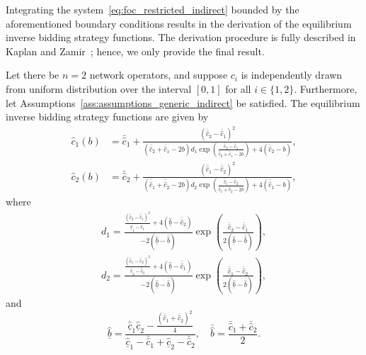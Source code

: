 Integrating the system~\eqref{eq:foc_restricted_indirect} bounded by the aforementioned boundary conditions results in the derivation of the equilibrium inverse bidding strategy functions. The derivation procedure is fully described in Kaplan and Zamir~\cite{KaplanZamir2007}; hence, we only provide the final result.
\begin{proposition}
\label{prop:equilibrium_restricted_indirect}
Let there be $n=2$ network operators, and suppose $c_i$ is independently drawn from uniform distribution over the interval $[0,1]$ for all $i\in \{1, 2\}$. Furthermore, let Assumptions~\ref{ass:assumptions_generic_indirect} be satisfied. The equilibrium inverse bidding strategy functions are given by
\begin{align}
  \label{eq:inverse_equi_bidding_str_1_indirect}
  \hat{c}_1(b) &= \bar{\hat{c}}_1 + \frac{(\bar{\hat{c}}_2 - \bar{\hat{c}}_1)^2}{(\bar{\hat{c}}_2 + \bar{\hat{c}}_1 - 2b)d_1 \exp{\left(\displaystyle\frac{\bar{\hat{c}}_2 - \bar{\hat{c}}_1}{\bar{\hat{c}}_2 + \bar{\hat{c}}_1 - 2b}\right)} + 4(\bar{\hat{c}}_2 - b)},\\[2ex]
  \label{eq:inverse_equi_bidding_str_2_indirect}
  \hat{c}_2(b) &= \bar{\hat{c}}_2 + \frac{(\bar{\hat{c}}_1 - \bar{\hat{c}}_2)^2}{(\bar{\hat{c}}_1 + \bar{\hat{c}}_2 - 2b)d_2 \exp{\left(\displaystyle\frac{\bar{\hat{c}}_1 - \bar{\hat{c}}_2}{\bar{\hat{c}}_1 + \bar{\hat{c}}_2 - 2b}\right)} + 4(\bar{\hat{c}}_1 - b)},
\end{align}
where
\begin{align}
  \label{eq:constant_d_1_indirect}
  d_1 = \frac{\displaystyle\frac{(\bar{\hat{c}}_2 - \bar{\hat{c}}_1)^2}{\underline{\hat{c}}_1 - \bar{\hat{c}}_1} + 4(\underline{\hat{b}} - \bar{\hat{c}}_2)}{-2(\underline{\hat{b}} - \bar{\hat{b}})} \exp{\left(\displaystyle\frac{\bar{\hat{c}}_2 - \bar{\hat{c}}_1}{2(\underline{\hat{b}} - \bar{\hat{b}})}\right)}, \\[2ex]
  \label{eq:constant_d_2_indirect}
  d_2 = \frac{\displaystyle\frac{(\bar{\hat{c}}_1 - \bar{\hat{c}}_2)^2}{\underline{\hat{c}}_2 - \bar{\hat{c}}_2} + 4(\underline{\hat{b}} - \bar{\hat{c}}_1)}{-2(\underline{\hat{b}} - \bar{\hat{b}})} \exp{\left(\frac{\bar{\hat{c}}_1 - \bar{\hat{c}}_2}{2(\underline{\hat{b}} - \bar{\hat{b}})}\right)},
\end{align}
and
\begin{equation}
  \label{eq:bounds_bid_restricted_indirect}
  \underline{\hat{b}} = \frac{\underline{\hat{c}}_1\underline{\hat{c}}_2 - \displaystyle\frac{(\bar{\hat{c}}_1 + \bar{\hat{c}}_2)^2}{4}}{\underline{\hat{c}}_1 - \bar{\hat{c}}_1 + \underline{\hat{c}}_2 - \bar{\hat{c}}_2},\quad
  \bar{\hat{b}} = \frac{\bar{\hat{c}}_1 + \bar{\hat{c}}_2}{2}.
\end{equation}
\end{proposition}
